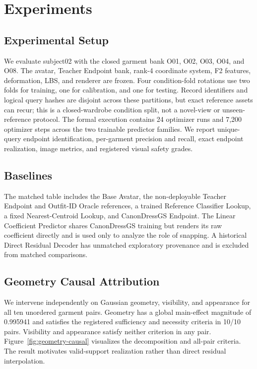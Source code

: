 \section{Experiments}

\subsection{Experimental Setup}
We evaluate subject02 with the closed garment bank O01, O02, O03, O04, and O08. The avatar, Teacher Endpoint bank, rank-4 coordinate system, F2 features, deformation, LBS, and renderer are frozen. Four condition-fold rotations use two folds for training, one for calibration, and one for testing. Record identifiers and logical query hashes are disjoint across these partitions, but exact reference assets can recur; this is a closed-wardrobe condition split, not a novel-view or unseen-reference protocol. The formal execution contains 24 optimizer runs and 7,200 optimizer steps across the two trainable predictor families. We report unique-query endpoint identification, per-garment precision and recall, exact endpoint realization, image metrics, and registered visual safety grades.

\subsection{Baselines}
The matched table includes the Base Avatar, the non-deployable Teacher Endpoint and Outfit-ID Oracle references, a trained Reference Classifier Lookup, a fixed Nearest-Centroid Lookup, and CanonDressGS Endpoint. The Linear Coefficient Predictor shares CanonDressGS training but renders its raw coefficient directly and is used only to analyze the role of snapping. A historical Direct Residual Decoder has unmatched exploratory provenance and is excluded from matched comparisons.



\subsection{Geometry Causal Attribution}
We intervene independently on Gaussian geometry, visibility, and appearance for all ten unordered garment pairs. Geometry has a global main-effect magnitude of 0.995941 and satisfies the registered sufficiency and necessity criteria in 10/10 pairs. Visibility and appearance satisfy neither criterion in any pair. Figure~\ref{fig:geometry-causal} visualizes the decomposition and all-pair criteria. The result motivates valid-support realization rather than direct residual interpolation.

